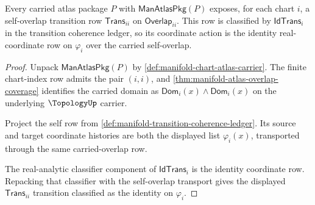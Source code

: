 \begin{theorem}
\label{thm:manifold-overlap-identity-transition}
Every carried atlas package $P$ with $\mathsf{ManAtlasPkg}(P)$ exposes, for
each chart $i$, a self-overlap transition row $\mathsf{Trans}_{ii}$ on
$\mathsf{Overlap}_{ii}$. This row is classified by $\mathsf{IdTrans}_i$ in the
transition coherence ledger, so its coordinate action is the identity
real-coordinate row on $\varphi_i$ over the carried self-overlap.
\end{theorem}
\begin{proof}
Unpack $\mathsf{ManAtlasPkg}(P)$ by
\autoref{def:manifold-chart-atlas-carrier}. The finite chart-index row admits
the pair $(i,i)$, and \autoref{thm:manifold-atlas-overlap-coverage} identifies
the carried domain as $\mathsf{Dom}_i(x)\wedge\mathsf{Dom}_i(x)$ on the
underlying $\TopologyUp$ carrier.

Project the self row from
\autoref{def:manifold-transition-coherence-ledger}. Its source and target
coordinate histories are both the displayed list $\varphi_i(x)$, transported
through the same carried-overlap row.

The real-analytic classifier component of $\mathsf{IdTrans}_i$ is the identity
coordinate row. Repacking that classifier with the self-overlap transport gives
the displayed $\mathsf{Trans}_{ii}$ transition classified as the identity on
$\varphi_i$.
\end{proof}

